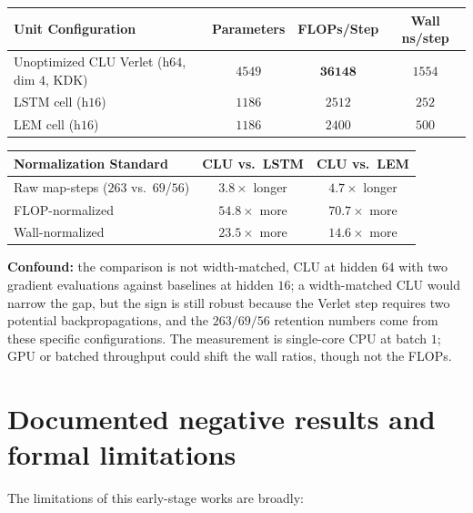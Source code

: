 \documentclass{article}
\begin{document}
\begin{center}
\begin{tabular}{lccc}
\toprule
Unit Configuration & Parameters & FLOPs/Step & Wall ns/step \\
\midrule
Unoptimized CLU Verlet (h$64$, dim $4$, KDK) & $4549$ & $\mathbf{36148}$ & $1554$ \\
LSTM cell (h$16$) & $1186$ & $2512$ & $252$ \\
LEM cell (h$16$) & $1186$ & $2400$ & $500$ \\
\bottomrule
\end{tabular}
\end{center}

\begin{center}
\begin{tabular}{lcc}
\toprule
Normalization Standard & CLU vs.\ LSTM & CLU vs.\ LEM \\
\midrule
Raw map-steps ($263$ vs.\ $69$/$56$) & $3.8\times$ longer & $4.7\times$ longer \\
FLOP-normalized & $\mathbf{54.8\times}$ more & $\mathbf{70.7\times}$ more \\
Wall-normalized & $\mathbf{23.5\times}$ more & $\mathbf{14.6\times}$ more \\
\bottomrule
\end{tabular}
\end{center}

\textbf{Confound:} the comparison is not width-matched, CLU at hidden $64$ with two gradient evaluations against baselines at hidden $16$; a width-matched CLU would narrow the gap, but the sign is still robust because the Verlet step requires two potential backpropagations, and the $263/69/56$ retention numbers come from these specific configurations. The measurement is single-core CPU at batch $1$; GPU or batched throughput could shift the wall ratios, though not the FLOPs.

\section{Documented negative results and formal limitations}\label{app:neg}

The limitations of this early-stage works are broadly:
\end{document}
